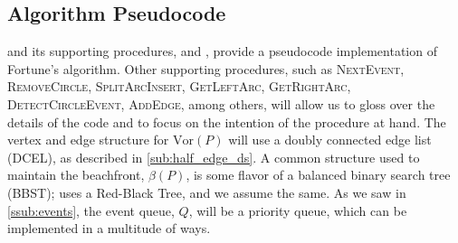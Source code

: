 \documentclass[12pt,twoside]{reedthesis}
\begin{document}
  \clearpage

  \subsection{Algorithm Pseudocode} %
  \label{sub:sweep_algorithm_pseudocode}
     and its supporting procedures,  and , provide a pseudocode implementation of Fortune's algorithm. Other supporting procedures, such as \textsc{NextEvent, RemoveCircle, SplitArcInsert, GetLeftArc, GetRightArc, DetectCircleEvent, AddEdge}, among others, will allow us to gloss over the details of the code and to focus on the intention of the procedure at hand. The vertex and edge structure for $\mbox{Vor}(P)$ will use a doubly connected edge list (DCEL), as described in \cref{sub:half_edge_ds}. A common structure used to maintain the beachfront, $\beta(P)$, is some flavor of a balanced binary search tree (BBST); \citealp{deberg} uses a Red-Black Tree, and we assume the same. As we saw in \cref{ssub:events}, the event queue, $Q$, will be a priority queue, which can be implemented in a multitude of ways.\par
    
\end{document}
